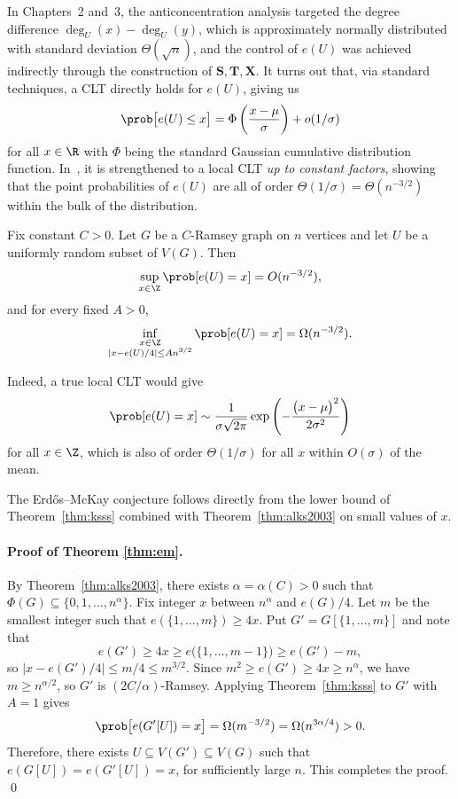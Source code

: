 In Chapters~2 and~3, the anticoncentration analysis targeted the degree difference $\deg_U(x) - \deg_U(y)$, which is approximately normally distributed with standard deviation $\Theta(\sqrt{n})$, and the control of $e(U)$ was achieved indirectly through the construction of $\mathbf{S}, \mathbf{T}, \mathbf{X}$. It turns out that, via standard techniques, a CLT directly holds for $e(U)$, giving us
\[
  \prob\bigl[e(U) \leq x\bigr] = \Phi\left(\frac{x - \mu}{\sigma}\right) + o(1/\sigma)
\]
for all $x \in \R$ with $\Phi$ being the standard Gaussian cumulative distribution function. In~\cite{Kwan_2023}, it is strengthened to a local CLT \textit{up to constant factors}, showing that the point probabilities of $e(U)$ are all of order $\Theta(1/\sigma) = \Theta(n^{-3/2})$ within the bulk of the distribution.

\begin{theorem}
  \label{thm:ksss}
  Fix constant $C > 0$. Let $G$ be a $C$-Ramsey graph on $n$ vertices and let $U$ be a uniformly random subset of $V(G)$. Then
  \[
    \sup_{x \in \Z} \prob[e(U) = x]
    = O(n^{-3/2}),
  \]
  and for every fixed $A > 0$,
  \[
    \inf_{\substack{x \in \Z \\
      |x - e(U)/4| \leq A n^{3/2}}}
    \prob[e(U) = x]
    = \Omega(n^{-3/2}).
  \]
\end{theorem}
Indeed, a true local CLT would give
\[
  \prob[e(U) = x] \sim \frac{1}{\sigma\sqrt{2\pi}} \exp\left(-\frac{\bigl(x - \mu\bigr)^2}{2\sigma^2}\right)
\]
for all $x \in \Z$, which is also of order $\Theta(1/\sigma)$ for all $x$ within $O(\sigma)$ of the mean.

The Erd\H{o}s--McKay conjecture follows directly from the lower bound of Theorem~\ref{thm:ksss} combined with Theorem~\ref{thm:alks2003} on small values of $x$.

\paragraph{Proof of Theorem \ref{thm:em}.} 
By Theorem~\ref{thm:alks2003}, there exists $\alpha = \alpha(C) > 0$ such that $\Phi(G) \subseteq \{0, 1, \ldots, n^\alpha\}$. Fix integer $x$ between $n^\alpha$ and $e(G)/4$. Let $m$ be the smallest integer such that $e(\{1, \ldots, m\}) \geq 4x$. Put $G' = G[\{1, \ldots, m\}]$ and note that 
\[
  e(G') \geq 4x \geq e\bigl(\{1, \ldots, m-1\}\bigr) \geq e(G') - m,
\]
so $|x - e(G')/4| \leq m/4 \leq m^{3/2}$. Since $m^2 \geq e(G') \geq 4x \geq n^\alpha$, we have $m \geq n^{\alpha/2}$, so $G'$ is $(2C/\alpha)$-Ramsey. Applying Theorem~\ref{thm:ksss} to $G'$ with $A = 1$ gives
\[
  \prob\bigl[e(G'[U]) = x\bigr] = \Omega(m^{-3/2}) = \Omega(n^{3\alpha/4}) > 0.
\]
Therefore, there exists $U \subseteq V(G') \subseteq V(G)$ such that $e(G[U]) = e(G'[U]) = x$, for sufficiently large $n$. This completes the proof. \qed

